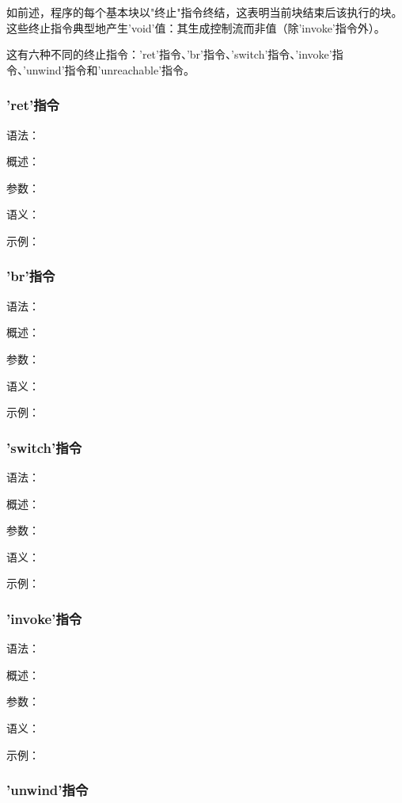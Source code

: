 \documentclass[12pt,a4paper]{article}
\begin{document}
{如前述，程序的每个基本块以"终止"指令终结，这表明当前块结束后该执行的块。这些终止指令典型地产生'void'值：其生成控制流而非值（除'invoke'指令外）。

这有六种不同的终止指令：'ret'指令、'br'指令、'switch'指令、'invoke'指令、'unwind'指令和'unreachable'指令。

\subsubsection{'ret'指令} %

语法：

概述：

参数：

语义：

示例：


\subsubsection{'br'指令} %

语法：

概述：

参数：

语义：

示例：


\subsubsection{'switch'指令} %

语法：

概述：

参数：

语义：

示例：


\subsubsection{'invoke'指令} %

语法：

概述：

参数：

语义：

示例：


\subsubsection{'unwind'指令} %

}
\end{document}
